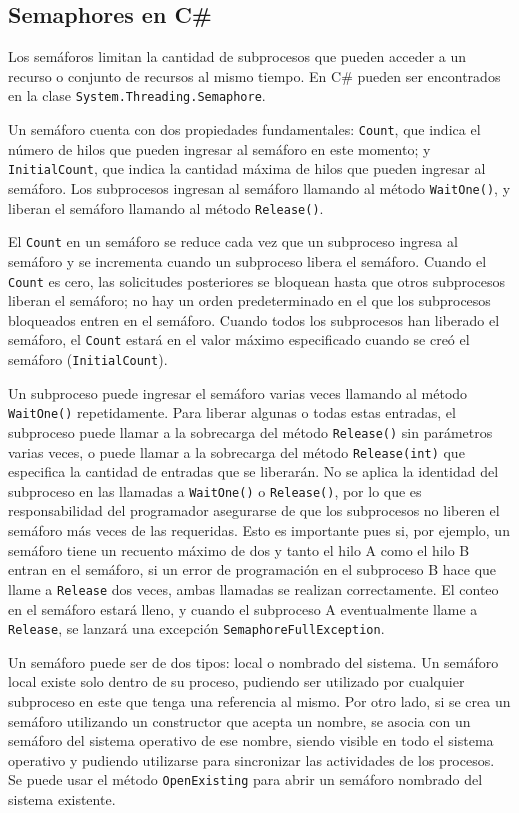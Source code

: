 \documentclass[10pt]{article} %
\newcommand{\csl}[1]{\colorbox{backcolour}{\texttt{#1}}}
\begin{document}
\subsection{Semaphores en C\#}

Los sem\'aforos limitan la cantidad de subprocesos que pueden acceder a un recurso o conjunto de recursos al mismo tiempo. En C\# pueden ser encontrados en la clase \csl{System.Threading.Semaphore}.

Un sem\'aforo cuenta con dos propiedades fundamentales: \csl{Count}, que indica el n\'umero de hilos que pueden ingresar al sem\'aforo en este momento; y \csl{InitialCount}, que indica la cantidad m\'axima de hilos que pueden ingresar al sem\'aforo. Los subprocesos ingresan al semáforo llamando al método \csl{WaitOne()}, y liberan el semáforo llamando al método \csl{Release()}.

El \csl{Count} en un semáforo se reduce cada vez que un subproceso ingresa al semáforo y se incrementa cuando un subproceso libera el semáforo. Cuando el \csl{Count} es cero, las solicitudes posteriores se bloquean hasta que otros subprocesos liberan el semáforo; no hay un orden predeterminado en el que los subprocesos bloqueados entren en el semáforo. Cuando todos los subprocesos han liberado el semáforo, el \csl{Count} estar\'a en el valor máximo especificado cuando se creó el semáforo (\csl{InitialCount}).

Un subproceso puede ingresar el semáforo varias veces llamando al método \csl{WaitOne()} repetidamente. Para liberar algunas o todas estas entradas, el subproceso puede llamar a la sobrecarga del método \csl{Release()} sin parámetros varias veces, o puede llamar a la sobrecarga del método \csl{Release(int)} que especifica la cantidad de entradas que se liberarán. No se aplica la identidad del subproceso en las llamadas a \csl{WaitOne()} o \csl{Release()}, por lo que es responsabilidad del programador asegurarse de que los subprocesos no liberen el semáforo m\'as veces de las requeridas.  Esto es importante pues si, por ejemplo, un semáforo tiene un recuento máximo de dos y tanto el hilo A como el hilo B entran en el semáforo, si un error de programación en el subproceso B hace que llame a \csl{Release} dos veces, ambas llamadas se realizan correctamente. El conteo en el semáforo estar\'a lleno, y cuando el subproceso A eventualmente llame a \csl{Release}, se lanzar\'a una excepci\'on \csl{SemaphoreFullException}.

Un sem\'aforo puede ser de dos tipos: local o nombrado del sistema. Un semáforo local existe solo dentro de su proceso, pudiendo ser utilizado por cualquier subproceso en este que tenga una referencia al mismo. Por otro lado, si se crea un sem\'aforo utilizando un constructor que acepta un nombre, se asocia con un semáforo del sistema operativo de ese nombre, siendo visible en todo el sistema operativo y pudiendo utilizarse para sincronizar las actividades de los procesos. Se puede usar el método \csl{OpenExisting} para abrir un semáforo nombrado del sistema existente.
\end{document}
